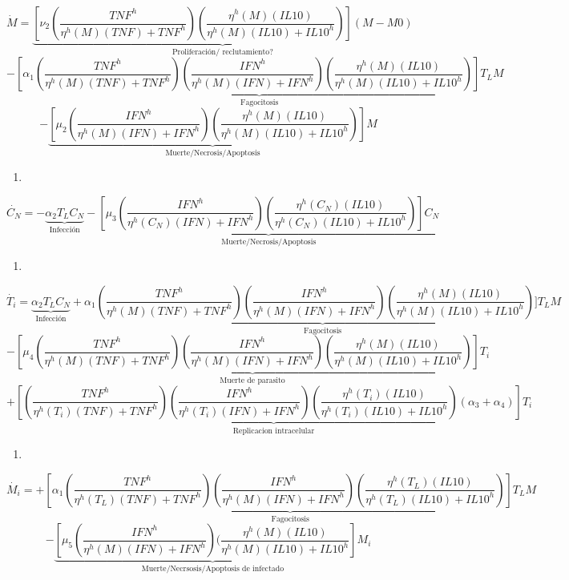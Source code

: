 \documentclass[
]{article}
\providecommand{\tightlist}{%
  \setlength{\itemsep}{0pt}\setlength{\parskip}{0pt}}
\begin{document}
\[ \dot{M}= \underbrace{[\nu_{2}(\dfrac{TNF^{h}}{\eta^{h}(M)(TNF)+TNF^{h}})(\dfrac{\eta^{h}(M)(IL10)}{\eta^{h}(M)(IL10)+IL10^{h}})](M-M0)}_\text{{Proliferación/ reclutamiento?}}\]
\[-\underbrace{[\alpha_{1}(\dfrac{TNF^{h}}{\eta^{h}(M)(TNF)+ TNF^{h}})(\dfrac{IFN^{h}}{\eta^{h}(M)(IFN)+IFN^{h}})(\dfrac{\eta^{h}(M)(IL10)}{\eta^{h}(M)(IL10)+IL10^{h}})]T_{L}M}_{\text{Fagocitosis}}\]
\[-\underbrace{[\mu_{2}(\dfrac{IFN^{h}}{\eta^{h}(M)(IFN)+IFN^{h}})(\dfrac{\eta^{h}(M)(IL10)}{\eta^{h}(M)(IL10)+IL10^{h}})]M}_{\text{Muerte/Necrosis/Apoptosis}}  \]

\begin{enumerate}
\def\labelenumi{\arabic{enumi}.}
\setcounter{enumi}{2}
\tightlist
\item
\end{enumerate}

\[ \dot{C_{N}}= -\underbrace{\alpha_{2}T_{L}C_{N}}_{\text{Infección}}-\underbrace{[\mu_{3}(\dfrac{IFN^{h}}{\eta^{h}(C_{N})(IFN)+IFN^{h}})(\dfrac{\eta^{h}(C_{N})(IL10)}{\eta^{h}(C_{N})(IL10)+IL10^{h}})]C_{N}}_{\text{Muerte/Necrosis/Apoptosis}} \]

\begin{enumerate}
\def\labelenumi{\arabic{enumi}.}
\setcounter{enumi}{3}
\tightlist
\item
\end{enumerate}

\[ \dot{T_{i}}=\underbrace{\alpha_{2}T_{L}C_{N}}_{\text{Infección}}+\underbrace{\alpha_{1}(\dfrac{TNF^{h}}{\eta^{h}(M)(TNF)+ TNF^{h}})(\dfrac{IFN^{h}}{\eta^{h}(M)(IFN)+IFN^{h}})(\dfrac{\eta^{h}(M)(IL10)}{\eta^{h}(M)(IL10)+IL10^{h}})]T_{L}M}_{\text{Fagocitosis}}  \]
\[-\underbrace{[\mu_{4}(\dfrac{TNF^{h}}{\eta^{h}(M)(TNF)+TNF^{h}})(\dfrac{IFN^{h}}{\eta^{h}(M)(IFN)+IFN^{h}})(\dfrac{\eta^{h}(M)(IL10)}{\eta^{h}(M)(IL10)+IL10^{h}})]T_{i}}_{\text{Muerte de parasito}} \]
\[+\underbrace{[(\dfrac{TNF^{h}}{\eta^{h}(T_{i})(TNF)+TNF^{h}})(\dfrac{IFN^{h}}{\eta^{h}(T_{i})(IFN)+IFN^{h}})(\dfrac{\eta^{h}(T_{i})(IL10)}{\eta^{h}(T_{i})(IL10)+IL10^{h}})(\alpha_{3}+\alpha_{4})]T_{i}}_{\text{Replicacion intracelular}}  \]

\begin{enumerate}
\def\labelenumi{\arabic{enumi}.}
\setcounter{enumi}{4}
\tightlist
\item
\end{enumerate}

\[ \dot{M_{i}}= +\underbrace{[\alpha_{1}(\dfrac{TNF^{h}}{\eta^{h}(T_{L})(TNF)+TNF^{h}})(\dfrac{IFN^{h}}{\eta^{h}(M)(IFN)+IFN^{h}})(\dfrac{\eta^{h}(T_{L})(IL10)}{\eta^{h}(T_{L})(IL10)+IL10^{h}})]T_{L}M}_{\text{Fagocitosis}}   \]
\[-\underbrace{[\mu_{5}(\dfrac{IFN^{h}}{\eta^{h}(M)(IFN)+IFN^{h}})(\dfrac{\eta^{h}(M)(IL10)}{\eta^{h}(M)(IL10)+IL10^{h}}]M_{i}}_{\text{Muerte/Necrsosis/Apoptosis de infectado}}  \]
\end{document}
